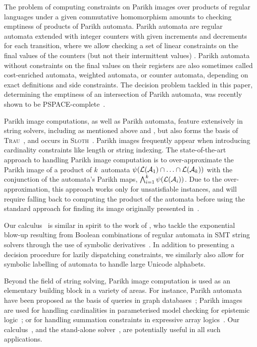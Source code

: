 The problem of computing constraints on Parikh images over products of regular
languages under a given commutative homomorphism amounts to checking emptiness
of products of
Parikh automata. Parikh automata are regular automata extended with integer
counters with given increments and decrements for each transition, where we
allow checking a set of linear constraints on the final values of the counters
(but not their intermittent values) \cite{parikh-automata}. Parikh automata
without constraints on the final values on their registers are also sometimes
called cost-enriched automata, weighted automata, or counter automata, depending
on exact definitions and side constraints. The decision problem tackled in this
paper, determining the emptiness of an intersection of Parikh automata, was
recently shown to be PSPACE-complete~\cite{graph-queries}.

Parikh image computations, as well as Parikh automata, feature extensively in
string solvers, including as mentioned above \Ostrich{} and \OstrichPlus{}
\cite{ostrich,ostrich-plus}, but also forms the basis of
\textsc{Trau}~\cite{trau-pldi},
and occurs in \textsc{Sloth}~\cite{sloth}. Parikh images frequently appear when
introducing cardinality constraints like length or string indexing. The
state-of-the-art approach to handling Parikh image computation is to
over-approximate the Parikh image of a product of $k$~automata
$\operatorname{\psi}(\operatorname{\mathcal{L}}(\mathcal{A}_1) \cap \ldots \cap \operatorname{\mathcal{L}}(\mathcal{A}_k))$
with the conjunction of the automata's Parikh maps, $\bigwedge_{i=1}^{k}
\operatorname{\psi}(\operatorname{\mathcal{L}}(\mathcal{A}_i))$. Due to the over-approximation,
this approach works only for unsatisfiable instances,
and will require falling back to computing the product of the automata before
using the standard approach for finding its image originally presented
in~\cite{generate-parikh-image}.

Our calculus~\Calculus{} is similar in spirit to the work
of \citeauthor{symbolic-boolean-derivatives}, who tackle the exponential
blow-up resulting from Boolean combinations
of regular automata in SMT string solvers
through the use of symbolic derivatives~\cite{symbolic-boolean-derivatives}.
In addition to presenting a decision procedure for lazily dispatching
constraints, we similarly also allow for symbolic labelling of automata to
handle large Unicode alphabets.

Beyond the field of string solving, Parikh image computation is used
as an elementary building block in a variety of areas.  For instance,
Parikh automata have been proposed as the basis of queries in graph
databases~\cite{graph-queries}; Parikh images are used for handling
cardinalities in parameterised model checking for epistemic
logic~\cite{epistemic-logic}; or for handling summation constraints in
expressive array logics~\cite{rodrigoRaya}. Our calculus~\Calculus{},
and the stand-alone solver~\Catra{},
are potentially useful in all such applications.

